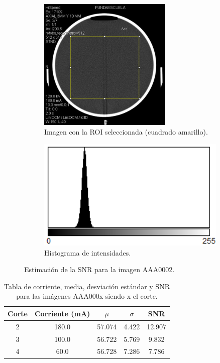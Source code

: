 \documentclass[letterpaper,12pt]{article}
\theoremstyle{plain}
\begin{document}
\begin{figure}[H]
    \centering
         \begin{subfigure}[h]{0.49\linewidth}
            \centering
            \includegraphics[width=0.7\textwidth]{Figuras/roi_corte2.png}
            \caption{Imagen con la ROI seleccionada  (cuadrado amarillo).} 
         \end{subfigure}
         \begin{subfigure}[h]{0.49\linewidth}
            \centering
            \includegraphics[width=\textwidth]{Figuras/hist_corte2.png}
            \caption{Histograma de intensidades.}
         \end{subfigure}
    \caption{Estimación de la SNR para la imagen AAA0002.}
    \label{fig:SNR}
\end{figure}

\begin{table}[H]
    \centering
    \begin{tabular}{c||c|c|c|c}
    \hline
    Corte & Corriente (mA) & $\mu$     & $\sigma$ & SNR \\ \hline
    2     & 180.0          & 57.074 & 4.422 & 12.907   \\ \hline
    3     & 100.0          & 56.722 & 5.769 & 9.832   \\ \hline
    4     & 60.0           & 56.728 & 7.286 & 7.786   \\ \hline
    \end{tabular}
    \caption{Tabla de corriente, media, desviación estándar y SNR para las imágenes AAA000x siendo x el corte.} \label{tab:SNR}
\end{table}
\end{document}
